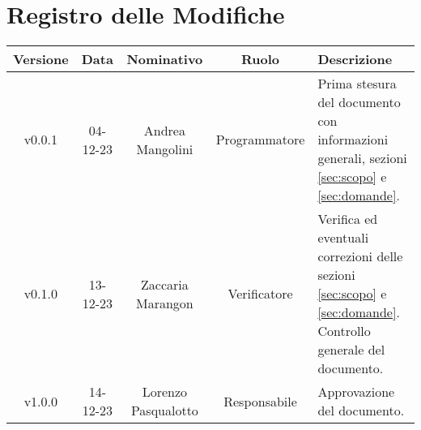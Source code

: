 \section*{\Large Registro delle Modifiche}
    \begin{table}[h]
        \centering
        \renewcommand\tabularxcolumn[1]{m{#1}} %
        \renewcommand{\arraystretch}{1.5}
        \begin{tabularx}{0.98\textwidth}
            {c|c|c|c|>{\centering\arraybackslash}X}
            \rowcolor{black}
            \textbf{\color{white} Versione} & \textbf{\color{white} Data} & \textbf{\color{white} Nominativo} & \textbf{\color{white} Ruolo} & \textbf{\color{white} Descrizione} \\ 
            \hline

            v0.0.1 & 04-12-23 & Andrea Mangolini & Programmatore & Prima stesura del documento con informazioni generali, sezioni \ref{sec:scopo} e \ref{sec:domande}. \\
            v0.1.0 & 13-12-23 & Zaccaria Marangon & Verificatore & Verifica ed eventuali correzioni delle sezioni \ref{sec:scopo} e \ref{sec:domande}. Controllo generale del documento.  \\
            v1.0.0 & 14-12-23 & Lorenzo Pasqualotto & Responsabile & Approvazione del documento.\\
            \hline
        \end{tabularx}
    \end{table}
